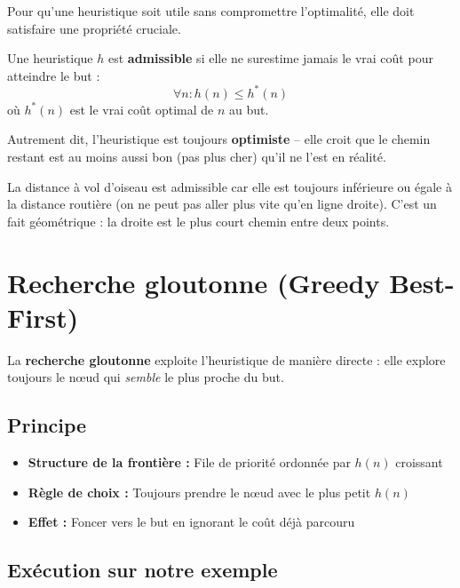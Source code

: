 \documentclass[11pt,a4paper]{article}
\begin{document}
Pour qu'une heuristique soit utile sans compromettre l'optimalité, elle doit satisfaire une propriété cruciale.

\begin{definitionbox}
Une heuristique $h$ est \textbf{admissible} si elle ne surestime jamais le vrai coût pour atteindre le but :
$$\forall n : h(n) \leq h^*(n)$$
où $h^*(n)$ est le vrai coût optimal de $n$ au but.

Autrement dit, l'heuristique est toujours \textbf{optimiste} -- elle croit que le chemin restant est au moins aussi bon (pas plus cher) qu'il ne l'est en réalité.
\end{definitionbox}

La distance à vol d'oiseau est admissible car elle est toujours inférieure ou égale à la distance routière (on ne peut pas aller plus vite qu'en ligne droite). C'est un fait géométrique : la droite est le plus court chemin entre deux points.

\section{Recherche gloutonne (Greedy Best-First)}

La \textbf{recherche gloutonne} exploite l'heuristique de manière directe : elle explore toujours le nœud qui \textit{semble} le plus proche du but.

\subsection{Principe}

\begin{recipebox}
\begin{itemize}
    \item \textbf{Structure de la frontière :} File de priorité ordonnée par $h(n)$ croissant
    \item \textbf{Règle de choix :} Toujours prendre le nœud avec le plus petit $h(n)$
    \item \textbf{Effet :} Foncer vers le but en ignorant le coût déjà parcouru
\end{itemize}
\end{recipebox}

\subsection{Exécution sur notre exemple}
\end{document}
